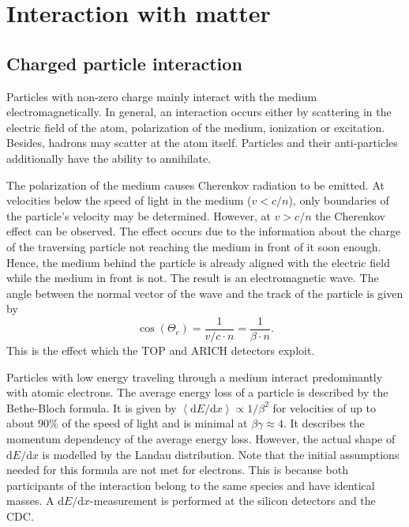 \section{Interaction with matter}
\label{sec:interaction_with_matter}

\subsection{Charged particle interaction}
\label{sec:interaction_with_matter}

Particles with non-zero charge mainly interact with the medium electromagnetically. In general, an interaction occurs either by scattering in the electric field of the atom, polarization of the medium, ionization or excitation. Besides, hadrons may scatter at the atom itself. Particles and their anti-particles additionally have the ability to annihilate.

The polarization of the medium causes Cherenkov radiation to be emitted. At velocities below the speed of light in the medium ($v < c/n$), only boundaries of the particle's velocity may be determined. However, at $v > c/n$ the Cherenkov effect can be observed. The effect occurs due to the information about the charge of the traversing particle not reaching the medium in front of it soon enough. Hence, the medium behind the particle is already aligned with the electric field while the medium in front is not. The result is an electromagnetic wave. The angle between the normal vector of the wave and the track of the particle is given by
\begin{equation}
	\cos(\Theta_{c}) = \frac{1}{v/c \cdot n} = \frac{1}{\beta \cdot n}
	\mathrm{.}
\end{equation}
This is the effect which the TOP and ARICH detectors exploit.

Particles with low energy traveling through a medium interact predominantly with atomic electrons. The average energy loss of a particle is described by the Bethe-Bloch formula. It is given by $\left< \mathrm{d}E/\mathrm{d}x \right> \propto 1/{\beta^2}$ for velocities of up to about $90\%$ of the speed of light and is minimal at $\beta \gamma \approx 4$. It describes the momentum dependency of the average energy loss. However, the actual shape of $\mathrm{d}E/\mathrm{d}x$ is modelled by the Landau distribution. Note that the initial assumptions needed for this formula are not met for electrons. This is because both participants of the interaction belong to the same species and have identical masses.
A $\mathrm{d}E/\mathrm{d}x$-measurement is performed at the silicon detectors and the CDC.

